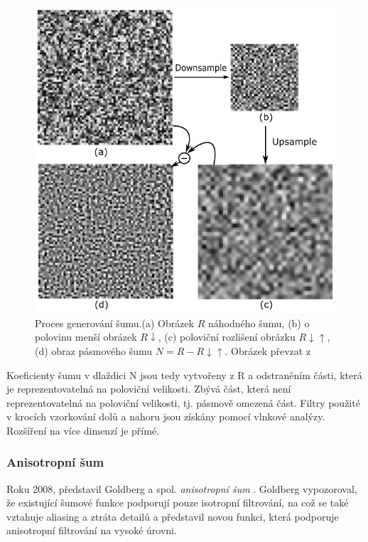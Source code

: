 \begin{figure}[H]
	\centering
	\includegraphics[scale=0.9]{obrazky-figures/WaveletNoise.pdf}
	\caption{Proces generování šumu.(a) Obrázek $R$ náhodného šumu, (b) o polovinu menší obrázek $R\downarrow$, (c) poloviční rozlišení obrázku $R{\downarrow\uparrow}$, (d) obraz pásmového šumu $N = R-R{\downarrow\uparrow}$. Obrázek převzat z \cite{Cook05}}
	\label{fig:WaveletNoise}
\end{figure}

Koeficienty šumu v dlaždici N jsou tedy vytvořeny z R a odstraněním části, která je reprezentovatelná na poloviční velikosti. Zbývá část, která není reprezentovatelná na poloviční velikosti, tj. pásmově omezená část. Filtry použité v krocích vzorkování dolů a nahoru jsou získány pomocí vlnkové analýzy. Rozšíření na více dimenzí je přímé.

\subsubsection{Anisotropní šum}
\label{AnisotropNoise}
Roku 2008, představil Goldberg a spol. \textit{anisotropní šum} \cite{Goldberg08}. Goldberg vypozoroval, že existující šumové funkce podporují pouze isotropní filtrování, na což se také vztahuje aliasing a ztráta detailů a představil novou funkci, která podporuje anisotropní filtrování na vysoké úrovni.


